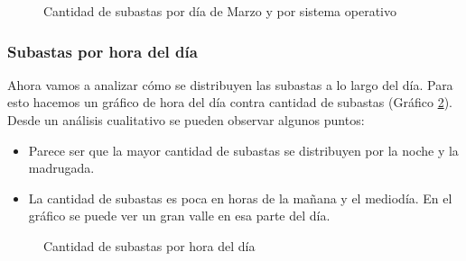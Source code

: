 \documentclass[a4paper, 12pt]{article}
\newcommand\tab[1][1cm]{\hspace*{#1}}
\begin{document}
	\FloatBarrier
	\begin{figure}
			\centering
		   	\caption{Cantidad de subastas por día de Marzo y por sistema operativo}
		   	\label{subastasmarzoSO}
		\end{figure}
	\FloatBarrier

	\subsubsection{Subastas por hora del día}
	\tab Ahora vamos a analizar cómo se distribuyen las subastas a lo largo del día. Para esto hacemos un gráfico de hora del día contra cantidad de subastas (Gráfico \ref{subastashora}).\newline
	\tab Desde un análisis cualitativo se pueden observar algunos puntos:
	\begin{itemize}
		\item Parece ser que la mayor cantidad de subastas se distribuyen por la noche y la madrugada.
		\item La cantidad de subastas es poca en horas de la mañana y el mediodía. En el gráfico se puede ver un gran valle en esa parte del día.
	\end{itemize}

	\FloatBarrier
		\begin{figure}
			\centering
		   	\caption{Cantidad de subastas por hora del día}
			\label{subastashora}
		\end{figure}
	\FloatBarrier
\end{document}
